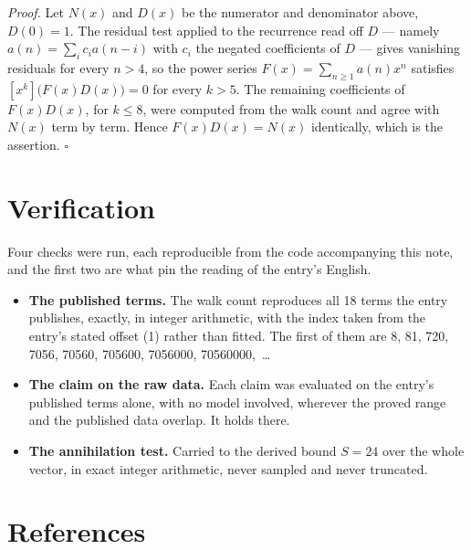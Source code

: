 \documentclass[11pt]{article}
\theoremstyle{definition}
\begin{document}
{\itshape Proof.} Let $N(x)$ and $D(x)$ be the numerator and denominator above, $D(0)=1$. The residual test applied to the recurrence read off $D$ --- namely $a(n) = \sum_i c_i a(n-i)$ with $c_i$ the negated coefficients of $D$ --- gives vanishing residuals for every $n > 4$, so the power series $F(x)=\sum_{n\ge 1}a(n)x^n$ satisfies $[x^k]\bigl(F(x)D(x)\bigr) = 0$ for every $k > 5$. The remaining coefficients of $F(x)D(x)$, for $k \le 8$, were computed from the walk count and agree with $N(x)$ term by term. Hence $F(x)D(x) = N(x)$ identically, which is the assertion. $\square$

\section{Verification}

Four checks were run, each reproducible from the code accompanying this note, and the first two are what pin the reading of the entry's English.

\begin{itemize}

\item {\bfseries The published terms.} The walk count reproduces all 18 terms the entry publishes, exactly, in integer arithmetic, with the index taken from the entry's stated offset (1) rather than fitted. The first of them are 8, 81, 720, 7056, 70560, 705600, 7056000, 70560000,~\dots

\item {\bfseries The claim on the raw data.} Each claim was evaluated on the entry's published terms alone, with no model involved, wherever the proved range and the published data overlap. It holds there.

\item {\bfseries The annihilation test.} Carried to the derived bound $S = 24$ over the whole vector, in exact integer arithmetic, never sampled and never truncated.

\end{itemize}

\section{References}
\end{document}
